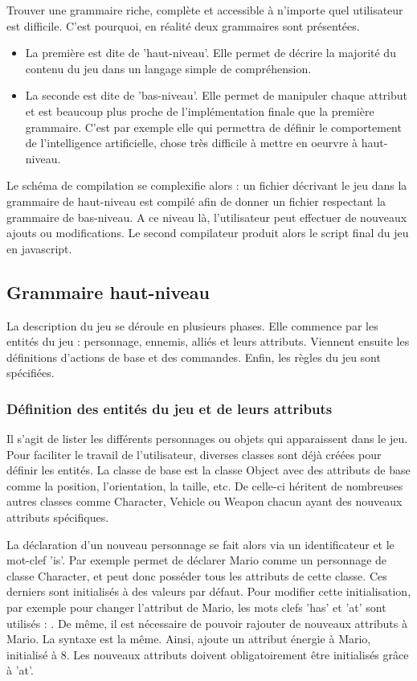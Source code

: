 Trouver une grammaire riche, complète et accessible à n'importe quel utilisateur est difficile.
C'est pourquoi, en réalité deux grammaires sont présentées.

\begin{itemize}
 \item La première est dite de 'haut-niveau'.
Elle permet de décrire la majorité du contenu du jeu dans un langage simple de compréhension.
 \item La seconde est dite de 'bas-niveau'.
Elle permet de manipuler chaque attribut et est beaucoup plus proche de l'implémentation finale que la première grammaire.
C'est par exemple elle qui permettra de définir le comportement de l'intelligence artificielle, chose très difficile à mettre en oeurvre à haut-niveau.
\end{itemize}

Le schéma de compilation se complexifie alors : un fichier décrivant le jeu dans la grammaire de haut-niveau est compilé afin de donner un fichier
respectant la grammaire de bas-niveau. A ce niveau là, l'utilisateur peut effectuer de nouveaux ajouts ou modifications. Le second compilateur
produit alors le script final du jeu en javascript.

\subsection{Grammaire haut-niveau}

La description du jeu se déroule en plusieurs phases.
Elle commence par les entités du jeu : personnage, ennemis, alliés et leurs attributs.
Viennent ensuite les définitions d'actions de base et des commandes.
Enfin, les règles du jeu sont spécifiées.

\subsubsection{Définition des entités du jeu et de leurs attributs}

Il s'agit de lister les différents personnages ou objets qui apparaissent dans le jeu.
Pour faciliter le travail de l'utilisateur, diverses classes sont déjà créées pour définir les entités.
La classe de base est la classe Object avec des attributs de base comme la position, l'orientation, la taille, etc.
De celle-ci héritent de nombreuses autres classes comme Character, Vehicle ou Weapon chacun ayant des nouveaux attributs spécifiques.

La déclaration d'un nouveau personnage se fait alors via un identificateur et le mot-clef 'is'.
Par exemple  permet de déclarer Mario comme un personnage de classe Character, 
et peut donc posséder tous les attributs de cette classe. Ces derniers sont initialisés à des valeurs par défaut.
Pour modifier cette initialisation, par exemple pour changer l'attribut  de Mario, les mots clefs 'has' et 'at' sont utilisés : 
.
De même, il est nécessaire de pouvoir rajouter de nouveaux attributs à Mario.
La syntaxe est la même. Ainsi,  ajoute un attribut énergie à Mario, initialisé à 8.
Les nouveaux attributs doivent obligatoirement être initialisés grâce à 'at'.

